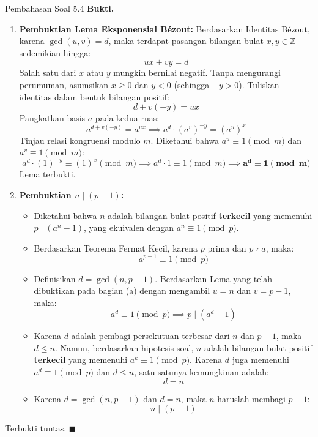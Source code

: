 \documentclass[11pt,a4paper]{article}
\newenvironment{proof}{\noindent\textbf{Bukti.}}{\hfill$\blacksquare$\vspace{0.3em}}
\begin{document}
\begin{solusibox}{Pembahasan Soal 5.4}
\begin{proof}
\begin{enumerate}[leftmargin=*]
    \item \textbf{Pembuktian Lema Eksponensial B\'ezout:}
    Berdasarkan Identitas B\'ezout, karena $\gcd(u, v) = d$, maka terdapat pasangan bilangan bulat $x, y \in \mathbb{Z}$ sedemikian hingga:
    \[
    u x + v y = d
    \]
    Salah satu dari $x$ atau $y$ mungkin bernilai negatif. Tanpa mengurangi perumuman, asumsikan $x \ge 0$ dan $y < 0$ (sehingga $-y > 0$).
    Tuliskan identitas dalam bentuk bilangan positif:
    \[
    d + v(-y) = u x
    \]
    Pangkatkan basis $a$ pada kedua ruas:
    \[
    a^{d + v(-y)} = a^{ux} \implies a^d \cdot (a^v)^{-y} = (a^u)^x
    \]
    Tinjau relasi kongruensi modulo $m$. Diketahui bahwa $a^u \equiv 1 \pmod m$ dan $a^v \equiv 1 \pmod m$:
    \[
    a^d \cdot (1)^{-y} \equiv (1)^x \pmod m \implies a^d \cdot 1 \equiv 1 \pmod m \implies \mathbf{a^d \equiv 1 \pmod m}
    \]
    Lema terbukti.
    \item \textbf{Pembuktian $n \mid (p - 1)$:}
    \begin{itemize}
        \item Diketahui bahwa $n$ adalah bilangan bulat positif \textbf{terkecil} yang memenuhi $p \mid (a^n - 1)$, yang ekuivalen dengan $a^n \equiv 1 \pmod p$.
        \item Berdasarkan Teorema Fermat Kecil, karena $p$ prima dan $p \nmid a$, maka:
        \[
        a^{p-1} \equiv 1 \pmod p
        \]
        \item Definisikan $d = \gcd(n, p - 1)$.
        Berdasarkan Lema yang telah dibuktikan pada bagian (a) dengan mengambil $u = n$ dan $v = p - 1$, maka:
        \[
        a^d \equiv 1 \pmod p \implies p \mid (a^d - 1)
        \]
        \item Karena $d$ adalah pembagi persekutuan terbesar dari $n$ dan $p - 1$, maka $d \le n$.
        Namun, berdasarkan hipotesis soal, $n$ adalah bilangan bulat positif \textbf{terkecil} yang memenuhi $a^k \equiv 1 \pmod p$.
        Karena $d$ juga memenuhi $a^d \equiv 1 \pmod p$ dan $d \le n$, satu-satunya kemungkinan adalah:
        \[
        d = n
        \]
        \item Karena $d = \gcd(n, p - 1)$ dan $d = n$, maka $n$ haruslah membagi $p - 1$:
        \[
        n \mid (p - 1)
        \]
    \end{itemize}
\end{enumerate}
Terbukti tuntas.
\end{proof}
\end{solusibox}
\end{document}
